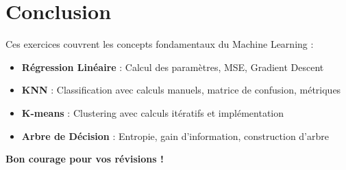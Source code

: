 \documentclass[11pt,a4paper]{article}
\begin{document}
\newpage


\section{Conclusion}

Ces exercices couvrent les concepts fondamentaux du Machine Learning :
\begin{itemize}
    \item \textbf{Régression Linéaire} : Calcul des paramètres, MSE, Gradient Descent
    \item \textbf{KNN} : Classification avec calculs manuels, matrice de confusion, métriques
    \item \textbf{K-means} : Clustering avec calculs itératifs et implémentation
    \item \textbf{Arbre de Décision} : Entropie, gain d'information, construction d'arbre
\end{itemize}

\textbf{Bon courage pour vos révisions !}
\end{document}
